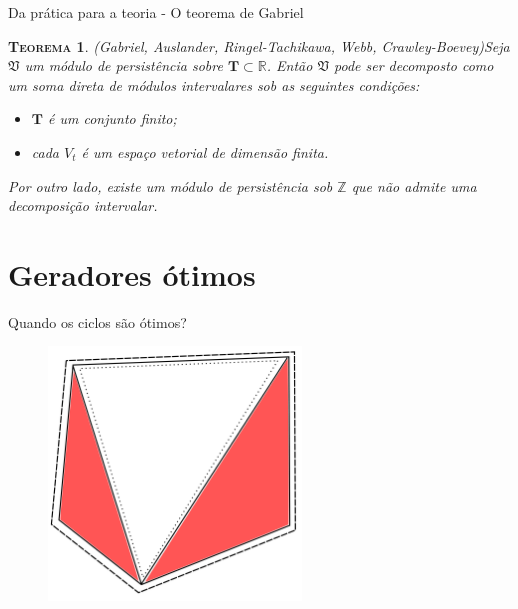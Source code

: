 \documentclass[10pt]{beamer}
\newtheorem{teo}{\scshape Teorema}
\begin{document}
\begin{frame}{Da prática para a teoria - O teorema de Gabriel}
    \begin{teo}{(Gabriel, Auslander, Ringel-Tachikawa, Webb, Crawley-Boevey)}\label{teo:crawley}
    Seja $\mathfrak{V}$ um módulo de persistência sobre $\mathbf{T} \subset \mathbb{R}$. Então $\mathfrak{V}$
    pode ser decomposto como um soma direta de módulos intervalares sob as seguintes condições:
    \begin{itemize} 
        \item $\mathbf{T}$ é um conjunto finito;
        \item cada $V_t$ é um espaço vetorial de dimensão finita. 
    \end{itemize}
    Por outro lado, existe um módulo de persistência sob $\mathbb{Z}$ que não admite uma decomposição intervalar. 
\end{teo}  
\end{frame}

\section{Geradores ótimos} 

\begin{frame}{Quando os ciclos são ótimos?}
    \begin{figure}
        \centering
        \includegraphics[width=0.6\textwidth]{images/ciclotimo}
    \end{figure}
\end{frame}
\end{document}
